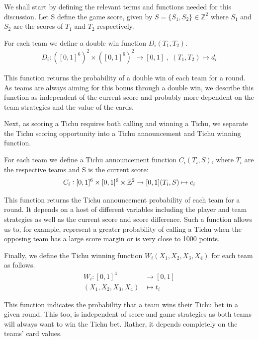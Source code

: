 We shall start by defining the relevant terms and functions needed for this discussion. Let S define the game score, given by $S = \{S_1, S_2\} \in \mathbb{Z}^2$ where $S_1$ and $S_2$ are the scores of $T_1$ and $T_2$ respectively.

\begin{definition}
For each team we define a double win function $D_i(T_1, T_2)$.
\begin{align*}
D_i: ([0,1]^6)^2\times([0,1]^6)^2 \to [0,1]\; ,\;(T_1,T_2) \mapsto d_i
\end{align*}
\end{definition}
This function returns the probability of a double win of each team for a round. As teams are always aiming for this bonus through a double win, we describe this function as independent of the current score and probably more dependent on the team strategies and the value of the cards.

Next, as scoring a Tichu requires both calling and winning a Tichu, we separate the Tichu scoring opportunity into a Tichu announcement and Tichu winning function. 

\begin{definition}
For each team we define a Tichu announcement function $C_i(T_i, S)$, where $T_i$ are the respective teams and S is the current score:
\begin{align*}
C_i: [0,1]^6 \times [0,1]^6 \times \mathbb{Z}^2 \to [0,1] (T_i,S) \mapsto c_i
\end{align*}
\end{definition}
This function returns the Tichu announcement probability of each team for a round. It depends on a host of different variables including the player and team strategies as well as the current score and score difference. Such a function allows us to, for example, represent a greater probability of calling a Tichu when the opposing team has a large score margin or is very close to 1000 points.


\begin{definition}
Finally, we define the Tichu winning function $W_i(X_1, X_2,X_3,X_4)$ for each team as follows.
\begin{align*}
W_i: [0,1]^4 &\to [0,1] \\(X_1,X_2,X_3,X_4) &\mapsto t_i
\end{align*}
\end{definition}
This function indicates the probability that a team wins their Tichu bet in a given round. This too, is independent of score and game strategies as both teams will always want to win the Tichu bet. Rather, it depends completely on the teams’ card values.

